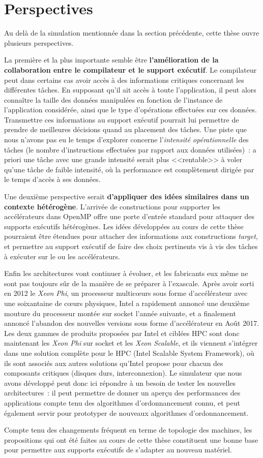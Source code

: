 \section*{Perspectives}

Au delà de la simulation mentionnée dans la section précédente, cette thèse ouvre plusieurs perspectives.

La première et la plus importante semble être \textbf{l'amélioration de la collaboration entre le compilateur et le support exécutif}.
Le compilateur peut dans certains cas avoir accès à des informations critiques concernant les différentes tâches.
En supposant qu'il ait accès à toute l'application, il peut alors connaître la taille des données manipulées en fonction de l'instance de l'application considérée, ainsi que le type d'opérations effectuées sur ces données.
Transmettre ces informations au support exécutif pourrait lui permettre de prendre de meilleures décisions quand au placement des tâches.
Une piste que nous n'avons pas eu le temps d'explorer concerne l'\emph{intensité opérationnelle} des tâches (le nombre d'instructions effectuées par rapport aux données utilisées)~: a priori une tâche avec une grande intensité serait plus <<rentable>> à voler qu'une tâche de faible intensité, où la performance est complètement dirigée par le temps d'accès à ses données.

Une deuxième perspective serait \textbf{d'appliquer des idées similaires dans un contexte hétérogène}.
L'arrivée de constructions pour supporter les accélérateurs dans OpenMP offre une porte d'entrée standard pour attaquer des supports exécutifs hétérogènes.
Les idées développées au cours de cette thèse pourraient être étendues pour attacher des informations aux constructions \emph{target}, et permettre au support exécutif de faire des choix pertinents vis à vis des tâches à exécuter sur le ou les accélérateurs.

Enfin les architectures vont continuer à évoluer, et les fabricants eux même ne sont pas toujours sûr de la manière de se préparer à l'exascale.
Après avoir sorti en 2012 le \emph{Xeon Phi}, un processeur multicœurs sous forme d'accélérateur avec une soixantaine de cœurs physiques, Intel a rapidement annoncé une deuxième mouture du processeur montée sur socket l'année suivante, et a finalement annoncé l'abandon des nouvelles versions sous forme d'accélérateur en Août 2017.
Les deux gammes de produits proposées par Intel et ciblées HPC sont donc maintenant les \emph{Xeon Phi} sur socket et les \emph{Xeon Scalable}, et ils viennent s'intégrer dans une solution complète pour le HPC (Intel Scalable System Framework), où ils sont associés aux autres solutions qu'Intel propose pour chacun des composants critiques (disques durs, interconnexion).
Le simulateur que nous avons développé peut donc ici répondre à un besoin de tester les nouvelles architectures~: il peut permettre de donner un aperçu des performances des applications compte tenu des algorithmes d'ordonnancement connu, et peut également servir pour prototyper de nouveaux algorithmes d'ordonnancement.

Compte tenu des changements fréquent en terme de topologie des machines, les propositions qui ont été faites au cours de cette thèse constituent une bonne base pour permettre aux supports exécutifs de s'adapter au nouveau matériel.
